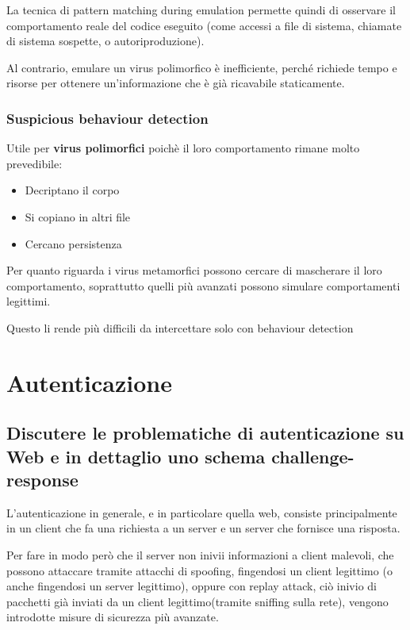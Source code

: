 \documentclass{report}
\begin{document}
\noindent La tecnica di pattern matching during emulation permette quindi di osservare il comportamento reale del codice eseguito (come accessi a file di sistema, chiamate di sistema sospette, o autoriproduzione).

\noindent Al contrario, emulare un virus polimorfico è inefficiente, perché richiede tempo e risorse per ottenere un'informazione che è già ricavabile staticamente.

\subsection{Suspicious behaviour detection}
\noindent Utile per \textbf{virus polimorfici} poichè il loro comportamento rimane molto prevedibile:
\begin{itemize}
    \item Decriptano il corpo
    \item Si copiano in altri file
    \item Cercano persistenza
\end{itemize}

\noindent Per quanto riguarda i virus metamorfici possono cercare di mascherare il loro comportamento,
soprattutto quelli più avanzati possono simulare comportamenti legittimi.

\noindent Questo li rende più difficili da intercettare solo con behaviour detection




\chapter{Autenticazione}

\section{Discutere le problematiche di autenticazione su Web e in dettaglio uno schema challenge-response}
\noindent L'autenticazione in generale, e in particolare quella web, consiste principalmente in un client che fa una richiesta a un server e un server che fornisce una risposta.

\noindent Per fare in modo però che il server non inivii informazioni a client malevoli, che possono attaccare tramite attacchi di spoofing,
fingendosi un client legittimo (o anche fingendosi un server legittimo), oppure con replay attack, ciò inivio di pacchetti già inviati da un client legittimo(tramite 
sniffing sulla rete), vengono introdotte misure di sicurezza più avanzate.
\end{document}
